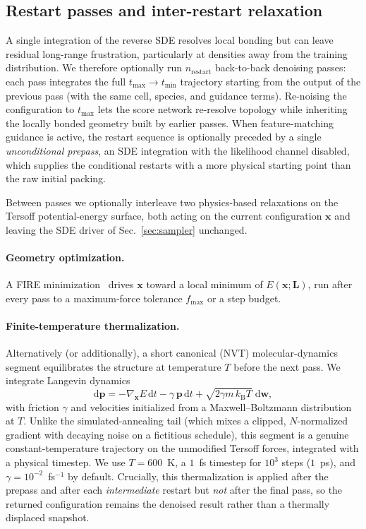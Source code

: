 \subsection{Restart passes and inter-restart relaxation}
\label{sec:restart}

A single integration of the reverse SDE resolves local bonding but can leave
residual long-range frustration, particularly at densities away from the
training distribution. We therefore optionally run $n_{\mathrm{restart}}$
back-to-back denoising passes: each pass integrates the full
$t_{\max}\!\to\!t_{\min}$ trajectory starting from the output of the previous
pass (with the same cell, species, and guidance terms). Re-noising the
configuration to $t_{\max}$ lets the score network re-resolve topology while
inheriting the locally bonded geometry built by earlier passes. When
feature-matching guidance is active, the restart sequence is optionally
preceded by a single \emph{unconditional prepass}, an SDE integration with the
likelihood channel disabled, which supplies the conditional restarts with a
more physical starting point than the raw initial packing.

Between passes we optionally interleave two physics-based relaxations on the
Tersoff potential-energy surface, both acting on the current configuration
$\mathbf{x}$ and leaving the SDE driver of Sec.~\ref{sec:sampler} unchanged.

\paragraph{Geometry optimization.}
A FIRE minimization~\cite{bitzek2006structural} drives $\mathbf{x}$ toward a
local minimum of $E(\mathbf{x};\mathbf{L})$, run after every pass to a
maximum-force tolerance $f_{\max}$ or a step budget.

\paragraph{Finite-temperature thermalization.}
Alternatively (or additionally), a short canonical (NVT) molecular-dynamics
segment equilibrates the structure at temperature $T$ before the next pass. We
integrate Langevin dynamics
\begin{equation}
    \mathrm{d}\mathbf{p}
    = -\nabla_{\mathbf{x}} E\,\mathrm{d}t
      - \gamma\,\mathbf{p}\,\mathrm{d}t
      + \sqrt{2\gamma m\,k_{\mathrm{B}}T}\;\mathrm{d}\mathbf{w},
    \label{eq:langevin-md}
\end{equation}
with friction $\gamma$ and velocities initialized from a Maxwell--Boltzmann
distribution at $T$. Unlike the simulated-annealing tail (which mixes a
clipped, $N$-normalized gradient with decaying noise on a fictitious schedule),
this segment is a genuine constant-temperature trajectory on the unmodified
Tersoff forces, integrated with a physical timestep. We use $T=600$~K, a
$1$~fs timestep for $10^{3}$ steps ($1$~ps), and $\gamma=10^{-2}$~fs$^{-1}$ by
default. Crucially, this thermalization is applied after the prepass and after
each \emph{intermediate} restart but \emph{not} after the final pass, so the
returned configuration remains the denoised result rather than a thermally
displaced snapshot.

